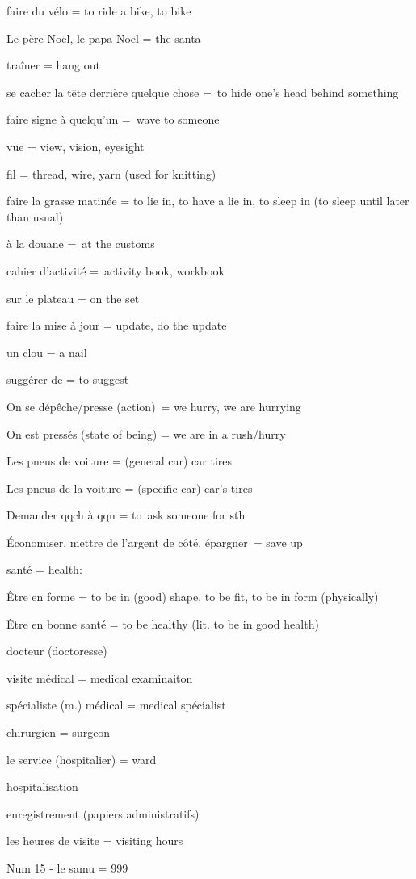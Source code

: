{faire du v}{é}{lo = to ride a bike, to bike}

Le père Noël, le papa Noël = the santa

traîner = hang out

se cacher la tête derrière quelque chose =~to hide one's head behind
something

faire signe à quelqu'un =~wave to someone

vue = view, vision, eyesight

fil = thread, wire, yarn (used for knitting)

faire la grasse matinée = to lie in, to have a lie in, to sleep in (to
sleep until later than usual)

à la douane =~at the customs

cahier d'activité =~activity book, workbook

sur le plateau = on the set

faire la mise à jour = update, do the update

un clou = a nail

suggérer de = to suggest

On se dépêche/presse (action)~= we hurry, we are hurrying~

On est pressés (state of being) = we are in a rush/hurry~

Les pneus de voiture = (general car) car tires

Les pneus de la voiture = (specific car) car's tires~

Demander qqch à qqn = to~ask someone for sth

Économiser, mettre de l'argent de côté, épargner~= save up~

santé = health:

Être en forme = to be in (good) shape, to be fit, to be in form
(physically)

Être en bonne santé = to be healthy (lit. to be in good health)

docteur (doctoresse)

visite médical = medical examinaiton

spécialiste (m.) médical = medical spécialist

chirurgien = surgeon

le service (hospitalier) = ward

hospitalisation

enregistrement (papiers administratifs)

les heures de visite = visiting hours

Num 15 - le samu = 999

